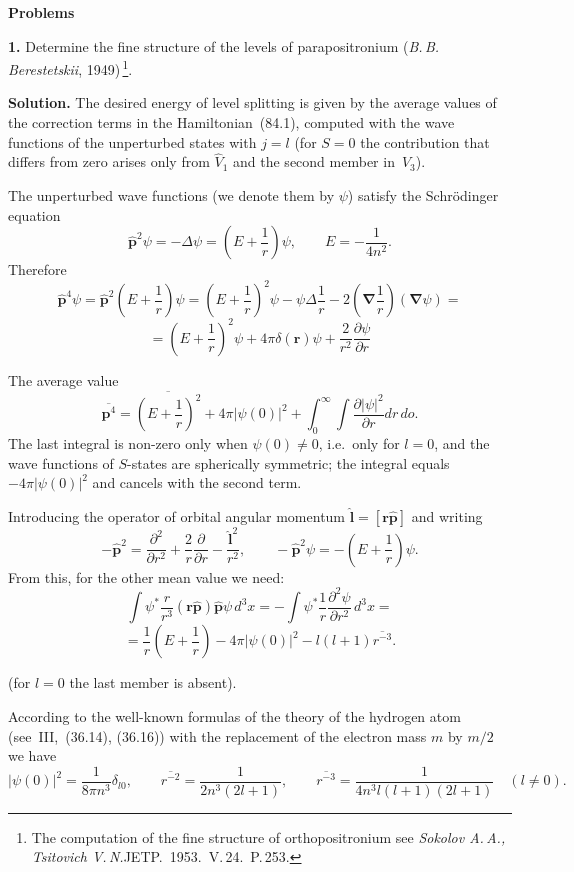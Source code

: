 \textbf{Problems}

\textbf{1.} Determine the fine structure of the levels of parapositronium (\textit{B.\,B.\,Berestetskii}, 1949)\,\footnote{The computation of the fine structure of orthopositronium see \textit{Sokolov A.\,A., Tsitovich V.\,N.}\/\/JETP.\ 1953.\ V.\,24.\ P.\,253.}.

\textbf{Solution.} The desired energy of level splitting is given by the average values of the correction terms in the Hamiltonian~(84.1), computed with the wave functions of the unperturbed states with $j = l$ (for $S = 0$ the contribution that differs from zero arises only from $\hat{V}_1$ and the second member in~$\hat{V}_3$).

The unperturbed wave functions (we denote them by $\psi$) satisfy the Schr\"odinger equation
\[
\hat{\mathbf{p}}^2\psi = -\Delta\psi = \left(E+\frac{1}{r}\right)\psi,\qquad E = -\frac{1}{4n^2}.
\]
Therefore
\[
\hat{\mathbf{p}}^4\psi = \hat{\mathbf{p}}^2\left(E+\frac{1}{r}\right)\psi = \left(E+\frac{1}{r}\right)^2\psi - \psi\Delta\frac{1}{r}-2\left(\boldsymbol{\nabla}\frac{1}{r}\right)(\boldsymbol{\nabla}\psi) =
\]
\[
= \left(E+\frac{1}{r}\right)^2\psi + 4\pi\delta(\mathbf{r})\psi + \frac{2}{r^2}\frac{\partial\psi}{\partial r}
\]

The average value
\[
\overline{\mathbf{p}^4} = \overline{\left(E+\frac{1}{r}\right)^2}+4\pi|\psi(0)|^2 + \int_0^\infty\int\frac{\partial|\psi|^2}{\partial r}dr\,do.
\]
The last integral is non-zero only when $\psi(0) \neq 0$, i.e.\ only for $l = 0$, and the wave functions of $S$-states are spherically symmetric; the integral equals $-4\pi|\psi(0)|^2$ and cancels with the second term.

Introducing the operator of orbital angular momentum $\hat{\mathbf{l}} = [\mathbf{r}\hat{\mathbf{p}}]$ and writing
\[
-\hat{\mathbf{p}}^2 = \frac{\partial^2}{\partial r^2}+\frac{2}{r}\frac{\partial}{\partial r}-\frac{\hat{\mathbf{l}}^2}{r^2},\qquad -\hat{\mathbf{p}}^2\psi = -\left(E+\frac{1}{r}\right)\psi.
\]
From this, for the other mean value we need:
\[
\int\psi^*\frac{r}{r^3}(\mathbf{r}\hat{\mathbf{p}})\hat{\mathbf{p}}\psi\,d^3x = -\int\psi^*\frac{1}{r}\frac{\partial^2\psi}{\partial r^2}\,d^3x =
\]
\[
= \frac{1}{r}\left(E+\frac{1}{r}\right) - 4\pi|\psi(0)|^2 - l(l+1)\overline{r^{-3}}.
\]

(for $l = 0$ the last member is absent).

According to the well-known formulas of the theory of the hydrogen atom (see~III,~(36.14), (36.16)) with the replacement of the electron mass $m$ by $m/2$ we have
\[
|\psi(0)|^2 = \frac{1}{8\pi n^3}\delta_{l0},\qquad \overline{r^{-2}} = \frac{1}{2n^3(2l+1)},\qquad \overline{r^{-3}} = \frac{1}{4n^3 l(l+1)(2l+1)}\quad(l \neq 0).
\]

